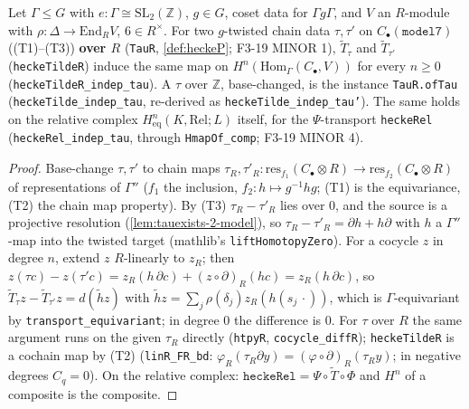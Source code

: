 \begin{theorem}
  Let $\Gamma\le G$ with $e:\Gamma\cong\mathrm{SL}_2(\mathbb Z)$, $g\in G$, coset data for $\Gamma g\Gamma$, and $V$ an $R$-module
  with $\rho:\Delta\to\mathrm{End}_R V$, $6\in R^\times$. For two $g$-twisted chain data $\tau,\tau'$ on $C_\bullet(\mathtt{model7})$
  ((T1)--(T3)) \textbf{over $R$} (\texttt{TauR}, \ref{def:heckeP}; F3-19 MINOR 1), $\widetilde T_\tau$ and $\widetilde T_{\tau'}$
  (\texttt{heckeTildeR}) induce the same map on $H^n(\mathrm{Hom}_\Gamma(C_\bullet,V))$ for every $n\ge0$
  (\texttt{heckeTildeR\_indep\_tau}). A $\tau$ over $\mathbb Z$, base-changed, is the instance \texttt{TauR.ofTau}
  (\texttt{heckeTilde\_indep\_tau}, re-derived as \texttt{heckeTilde\_indep\_tau'}). The same holds on the relative complex
  $H^n_{\mathrm{eq}}(K,\mathrm{Rel};L)$ itself, for the $\Psi$-transport \texttt{heckeRel} (\texttt{heckeRel\_indep\_tau}, through
  \texttt{HmapOf\_comp}; F3-19 MINOR 4).
\end{theorem}
\begin{proof}
  \leanok
  Base-change $\tau,\tau'$ to chain maps $\tau_R,\tau'_R:\mathrm{res}_{f_1}(C_\bullet\otimes R)\to\mathrm{res}_{f_2}(C_\bullet\otimes R)$
  of representations of $\Gamma''$ ($f_1$ the inclusion, $f_2:h\mapsto g^{-1}hg$; (T1) is the equivariance, (T2) the chain
  map property). By (T3) $\tau_R-\tau'_R$ lies over $0$, and the source is a projective resolution
  (\ref{lem:tauexists-2-model}), so $\tau_R-\tau'_R=\partial h+h\partial$ with $h$ a $\Gamma''$-map into the twisted target
  (mathlib's \texttt{liftHomotopyZero}). For a cocycle $z$ in degree $n$, extend $z$ $R$-linearly to $z_R$; then
  $z(\tau c)-z(\tau'c)=z_R(h\,\partial c)+(z\circ\partial)_R(h c)=z_R(h\,\partial c)$, so
  $\widetilde T_\tau z-\widetilde T_{\tau'}z=d(\tilde h z)$ with $\tilde h z=\sum_j\rho(\delta_j)z_R(h(s_j\,\cdot))$, which is
  $\Gamma$-equivariant by \texttt{transport\_equivariant}; in degree $0$ the difference is $0$. For $\tau$ over $R$ the same
  argument runs on the given $\tau_R$ directly (\texttt{htpyR}, \texttt{cocycle\_diffR}); \texttt{heckeTildeR} is a cochain map by
  (T2) (\texttt{linR\_FR\_bd}: $\varphi_R(\tau_R\partial y)=(\varphi\circ\partial)_R(\tau_Ry)$; in negative degrees $C_q=0$). On the
  relative complex: $\texttt{heckeRel}=\Psi\circ\widetilde T\circ\Phi$ and $H^n$ of a composite is the composite.
\end{proof}
